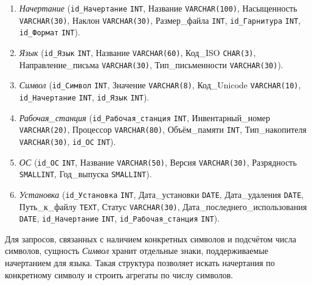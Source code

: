 \begin{enumerate}
    \item \textit{Начертание} (\texttt{id_Начертание} \texttt{INT},
    Название \texttt{VARCHAR(100)},
    Насыщенность \texttt{VARCHAR(30)},
    Наклон \texttt{VARCHAR(30)},
    Размер\_файла \texttt{INT},
    \texttt{id_Гарнитура} \texttt{INT},
    \texttt{id_Формат} \texttt{INT}).

    \item \textit{Язык} (\texttt{id_Язык} \texttt{INT},
    Название \texttt{VARCHAR(60)},
    Код\_ISO \texttt{CHAR(3)},
    Направление\_письма \texttt{VARCHAR(30)},
    Тип\_письменности \texttt{VARCHAR(30)}).

    \item \textit{Символ} (\texttt{id_Символ} \texttt{INT},
    Значение \texttt{VARCHAR(8)},
    Код\_Unicode \texttt{VARCHAR(10)},
    \texttt{id_Начертание} \texttt{INT},
    \texttt{id_Язык} \texttt{INT}).

    \item \textit{Рабочая\_станция} (\texttt{id_Рабочая_станция} \texttt{INT},
    Инвентарный\_номер \texttt{VARCHAR(20)},
    Процессор \texttt{VARCHAR(80)},
    Объём\_памяти \texttt{INT},
    Тип\_накопителя \texttt{VARCHAR(30)},
    \texttt{id_ОС} \texttt{INT}).

    \item \textit{ОС} (\texttt{id_ОС} \texttt{INT},
    Название \texttt{VARCHAR(50)},
    Версия \texttt{VARCHAR(30)},
    Разрядность \texttt{SMALLINT},
    Год\_выпуска \texttt{SMALLINT}).

    \item \textit{Установка} (\texttt{id_Установка} \texttt{INT},
    Дата\_установки \texttt{DATE},
    Дата\_удаления \texttt{DATE},
    Путь\_к\_файлу \texttt{TEXT},
    Статус \texttt{VARCHAR(30)},\newline
    Дата\_последнего\_использования \texttt{DATE},
    \texttt{id_Начертание} \texttt{INT},
    \texttt{id_Рабочая_станция} \texttt{INT}).
\end{enumerate}

Для запросов, связанных с наличием конкретных символов и подсчётом числа символов, сущность \textit{Символ} хранит отдельные знаки, поддерживаемые начертанием для языка. Такая структура позволяет искать начертания по конкретному символу и строить агрегаты по числу символов.

